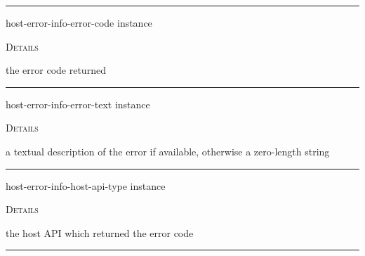 \documentclass[a4paper]{report}
\begin{document}
  

    \rule{\linewidth}{0.1mm}
    
    \label{portaudio__fun__host-error-info-error-code}
    \begin{defun}[Function]
    host-error-info-error-code instance


	
    \bigskip
    \textsc{Details}

the error code returned


    
    \end{defun}
  
  

    \rule{\linewidth}{0.1mm}
    
    \label{portaudio__fun__host-error-info-error-text}
    \begin{defun}[Function]
    host-error-info-error-text instance


	
    \bigskip
    \textsc{Details}

a textual description of the error if available, otherwise a zero-length string


    
    \end{defun}
  
  

    \rule{\linewidth}{0.1mm}
    
    \label{portaudio__fun__host-error-info-host-api-type}
    \begin{defun}[Function]
    host-error-info-host-api-type instance


	
    \bigskip
    \textsc{Details}

the host API which returned the error code


    
    \end{defun}
  
  

    \rule{\linewidth}{0.1mm}
    
\end{document}
